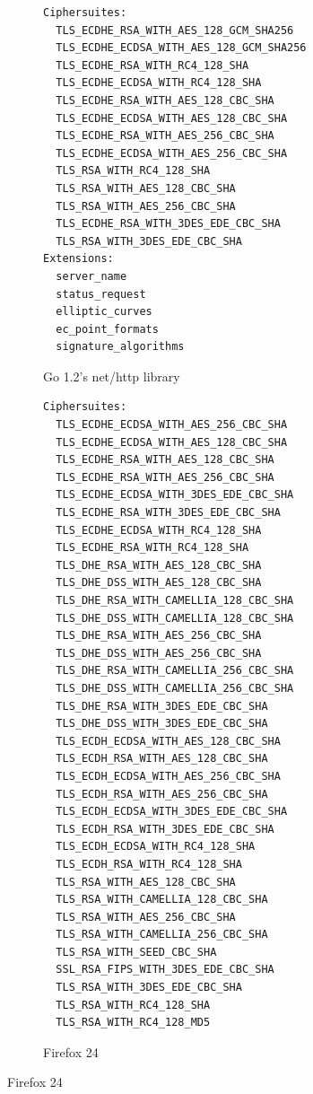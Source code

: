 \documentclass[conference]{IEEEtran}
\begin{document}
\begin{figure}
\centering
\begin{subfigure}[t]{0.30\textwidth}
\caption{Go 1.2's net/http library}
\begin{minipage}[t][25.5ex][t]{\textwidth}
\tiny
\begin{verbatim}
Ciphersuites:
  TLS_ECDHE_RSA_WITH_AES_128_GCM_SHA256
  TLS_ECDHE_ECDSA_WITH_AES_128_GCM_SHA256
  TLS_ECDHE_RSA_WITH_RC4_128_SHA
  TLS_ECDHE_ECDSA_WITH_RC4_128_SHA
  TLS_ECDHE_RSA_WITH_AES_128_CBC_SHA
  TLS_ECDHE_ECDSA_WITH_AES_128_CBC_SHA
  TLS_ECDHE_RSA_WITH_AES_256_CBC_SHA
  TLS_ECDHE_ECDSA_WITH_AES_256_CBC_SHA
  TLS_RSA_WITH_RC4_128_SHA
  TLS_RSA_WITH_AES_128_CBC_SHA
  TLS_RSA_WITH_AES_256_CBC_SHA
  TLS_ECDHE_RSA_WITH_3DES_EDE_CBC_SHA
  TLS_RSA_WITH_3DES_EDE_CBC_SHA
Extensions:
  server_name
  status_request
  elliptic_curves
  ec_point_formats
  signature_algorithms
\end{verbatim}
\end{minipage}
\label{fig:ciphersuites:golang}
\end{subfigure}
%
\begin{subfigure}[t]{0.30\textwidth}
\caption{Firefox 24}
\begin{minipage}[t][57ex][t]{\textwidth}
\tiny
\begin{verbatim}
Ciphersuites:
  TLS_ECDHE_ECDSA_WITH_AES_256_CBC_SHA
  TLS_ECDHE_ECDSA_WITH_AES_128_CBC_SHA
  TLS_ECDHE_RSA_WITH_AES_128_CBC_SHA
  TLS_ECDHE_RSA_WITH_AES_256_CBC_SHA
  TLS_ECDHE_ECDSA_WITH_3DES_EDE_CBC_SHA
  TLS_ECDHE_RSA_WITH_3DES_EDE_CBC_SHA
  TLS_ECDHE_ECDSA_WITH_RC4_128_SHA
  TLS_ECDHE_RSA_WITH_RC4_128_SHA
  TLS_DHE_RSA_WITH_AES_128_CBC_SHA
  TLS_DHE_DSS_WITH_AES_128_CBC_SHA
  TLS_DHE_RSA_WITH_CAMELLIA_128_CBC_SHA
  TLS_DHE_DSS_WITH_CAMELLIA_128_CBC_SHA
  TLS_DHE_RSA_WITH_AES_256_CBC_SHA
  TLS_DHE_DSS_WITH_AES_256_CBC_SHA
  TLS_DHE_RSA_WITH_CAMELLIA_256_CBC_SHA
  TLS_DHE_DSS_WITH_CAMELLIA_256_CBC_SHA
  TLS_DHE_RSA_WITH_3DES_EDE_CBC_SHA
  TLS_DHE_DSS_WITH_3DES_EDE_CBC_SHA
  TLS_ECDH_ECDSA_WITH_AES_128_CBC_SHA
  TLS_ECDH_RSA_WITH_AES_128_CBC_SHA
  TLS_ECDH_ECDSA_WITH_AES_256_CBC_SHA
  TLS_ECDH_RSA_WITH_AES_256_CBC_SHA
  TLS_ECDH_ECDSA_WITH_3DES_EDE_CBC_SHA
  TLS_ECDH_RSA_WITH_3DES_EDE_CBC_SHA
  TLS_ECDH_ECDSA_WITH_RC4_128_SHA
  TLS_ECDH_RSA_WITH_RC4_128_SHA
  TLS_RSA_WITH_AES_128_CBC_SHA
  TLS_RSA_WITH_CAMELLIA_128_CBC_SHA
  TLS_RSA_WITH_AES_256_CBC_SHA
  TLS_RSA_WITH_CAMELLIA_256_CBC_SHA
  TLS_RSA_WITH_SEED_CBC_SHA
  SSL_RSA_FIPS_WITH_3DES_EDE_CBC_SHA
  TLS_RSA_WITH_3DES_EDE_CBC_SHA
  TLS_RSA_WITH_RC4_128_SHA
  TLS_RSA_WITH_RC4_128_MD5

\end{verbatim}
\end{minipage}
\end{subfigure}
\end{figure}
\end{document}
